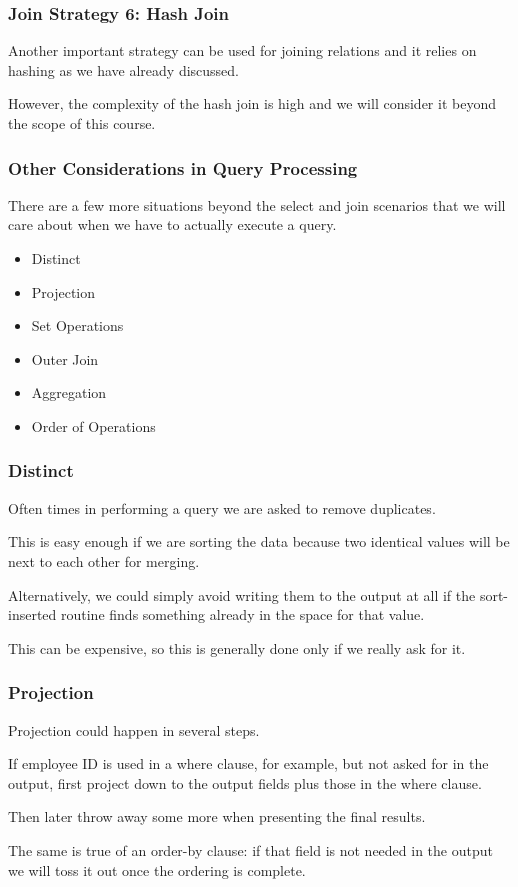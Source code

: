 \begin{frame}
\frametitle{Join Strategy 6: Hash Join}

Another important strategy can be used for joining relations and it relies on hashing as we have already discussed. 

However, the complexity of the hash join is high and we will consider it beyond the scope of this course.

\end{frame}


\begin{frame}
\frametitle{Other Considerations in Query Processing}

There are a few more situations beyond the select and join scenarios that we will care about when we have to actually execute a query.

\begin{itemize}
	\item Distinct
	\item Projection
	\item Set Operations
	\item Outer Join
	\item Aggregation
	\item Order of Operations
\end{itemize}


\end{frame}

\begin{frame}
\frametitle{Distinct}

Often times in performing a query we are asked to remove duplicates. 

This is easy enough if we are sorting the data because two identical values will be next to each other for merging. 

Alternatively, we could simply avoid writing them to the output at all if the sort-inserted routine finds something already in the space for that value. 

This can be expensive, so this is generally done only if we really ask for it.

\end{frame}

\begin{frame}
\frametitle{Projection}

Projection could happen in several steps. 

If employee ID is used in a where clause, for example, but not asked for in the output, first project down to the output fields plus those in the where clause.

Then later throw away some more when presenting the final results. 

The same is true of an order-by clause: if that field is not needed in the output we will toss it out once the ordering is complete.
\end{frame}

